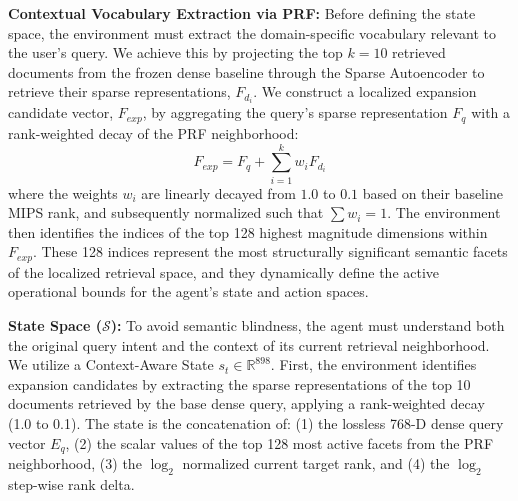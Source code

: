 \textbf{Contextual Vocabulary Extraction via PRF:} Before defining the state space, the environment must extract the domain-specific vocabulary relevant to the user's query. We achieve this by projecting the top $k=10$ retrieved documents from the frozen dense baseline through the Sparse Autoencoder to retrieve their sparse representations, $F_{d_i}$.
We construct a localized expansion candidate vector, $F_{exp}$, by aggregating the query's sparse representation $F_q$ with a rank-weighted decay of the PRF neighborhood:
\begin{equation}
F_{exp} = F_q + \sum_{i=1}^{k} w_i F_{d_i}
\end{equation}
where the weights $w_i$ are linearly decayed from $1.0$ to $0.1$ based on their baseline MIPS rank, and subsequently normalized such that $\sum w_i = 1$. The environment then identifies the indices of the top 128 highest magnitude dimensions within $F_{exp}$. These 128 indices represent the most structurally significant semantic facets of the localized retrieval space, and they dynamically define the active operational bounds for the agent's state and action spaces.

\textbf{State Space ($\mathcal{S}$):} To avoid semantic blindness, the agent must understand both the original query intent and the context of its current retrieval neighborhood. We utilize a Context-Aware State $s_t \in \mathbb{R}^{898}$. First, the environment identifies expansion candidates by extracting the sparse representations of the top 10 documents retrieved by the base dense query, applying a rank-weighted decay (1.0 to 0.1). The state is the concatenation of: (1) the lossless 768-D dense query vector $E_q$, (2) the scalar values of the top 128 most active facets from the PRF neighborhood, (3) the $\log_2$ normalized current target rank, and (4) the $\log_2$ step-wise rank delta.

